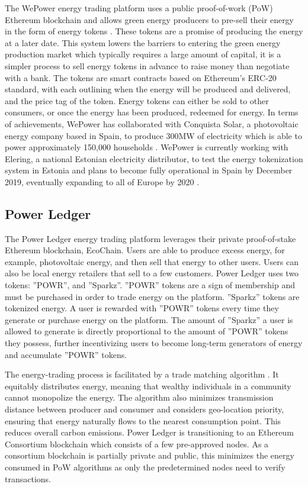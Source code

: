 The WePower energy trading platform uses a public proof-of-work (PoW) Ethereum blockchain and allows green energy producers to pre-sell their energy in the form of energy tokens \cite{WeP17}. These tokens are a promise of producing the energy at a later date. This system lowers the barriers to entering the green energy production market which typically requires a large amount of capital, it is a simpler process to sell energy tokens in advance to raise money than negotiate with a bank. The tokens are smart contracts based on Ethereum’s ERC-20 standard, with each outlining when the energy will be produced and delivered, and the price tag of the token. Energy tokens can either be sold to other consumers, or once the energy has been produced, redeemed for energy.
In terms of achievements, WePower has collaborated with Conquista Solar, a photovoltaic energy company based in Spain, to produce 300MW of electricity which is able to power approximately 150,000 households \cite{Hol18}. WePower is currently working with Elering, a national Estonian electricity distributor, to test the energy tokenization system in Estonia \cite{Deil18} and plans to become fully operational in Spain by December 2019, eventually expanding to all of Europe by 2020 \cite{WeP17}.

\subsection{Power Ledger}

The Power Ledger energy trading platform leverages their private proof-of-stake Ethereum blockchain, EcoChain. Users are able to produce excess energy, for example, photovoltaic energy, and then sell that energy to other users. Users can also be local energy retailers that sell to a few customers. Power Ledger uses two tokens: ”POWR”, and ”Sparkz”. ”POWR” tokens are a sign of membership and must be purchased in order to trade energy on the platform. ”Sparkz” tokens are tokenized energy. A user is rewarded with ”POWR” tokens every time they generate or purchase energy on the platform. The amount of ”Sparkz” a user is allowed to generate is directly proportional to the amount of ”POWR” tokens they possess, further incentivizing users to become long-term generators of energy and accumulate ”POWR” tokens.

The energy-trading process is facilitated by a trade matching algorithm \cite{Led18}. It equitably distributes energy, meaning that wealthy individuals in a community cannot monopolize the energy. The algorithm also minimizes transmission distance between producer and consumer and considers geo-location priority, ensuring that energy naturally flows to the nearest consumption point. This reduces overall carbon emissions.
Power Ledger is transitioning to an Ethereum Consortium blockchain \cite{Led18} which consists of a few pre-approved nodes. As a consortium blockchain is partially private and public, this minimizes the energy consumed in PoW algorithms as only the predetermined nodes need to verify transactions.

